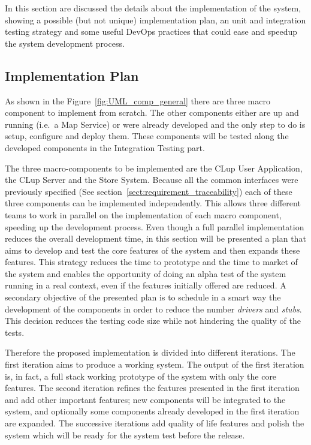 In this section are discussed the details about the implementation of the system, showing a possible (but not unique) implementation plan, an unit and integration testing strategy and some useful DevOps practices that could ease and speedup the system development process.


\subsection{Implementation Plan}
As shown in the Figure~\ref{fig:UML_comp_general} there are three macro component to implement from scratch. The other components either are up and running (i.e.~a Map Service) or were already developed and the only step to do is setup, configure and deploy them. These components will be tested along the developed components in the Integration Testing part.

The three macro-components to be implemented are the CLup User Application, the CLup Server and the Store System. Because all the common interfaces were previously specified (See section~\ref{sect:requirement_traceability}) each of these three components can be implemented independently. This allows three different teams to work in parallel on the implementation of each macro component, speeding up the development process.
Even though a full parallel implementation reduces the overall development time, in this section will be presented a plan that aims to develop and test the core features of the system and then expands these features. This strategy reduces the time to prototype and the time to market of the system and enables the opportunity of doing an alpha test of the system running in a real context, even if the features initially offered are reduced. A secondary objective of the presented plan is to schedule in a smart way the development of the components in order to reduce the number \textit{drivers} and \textit{stubs}. This decision reduces the testing code size while not hindering the quality of the tests.

Therefore the proposed implementation is divided into different iterations. The first iteration aims to produce a working system. The output of the first iteration is, in fact, a full stack working prototype of the system with only the core features. The second iteration refines the features presented in the first iteration and add other important features; new components will be integrated to the system, and optionally some components already developed in the first iteration are expanded. The successive iterations add quality of life features and polish the system which will be ready for the system test before the release.

